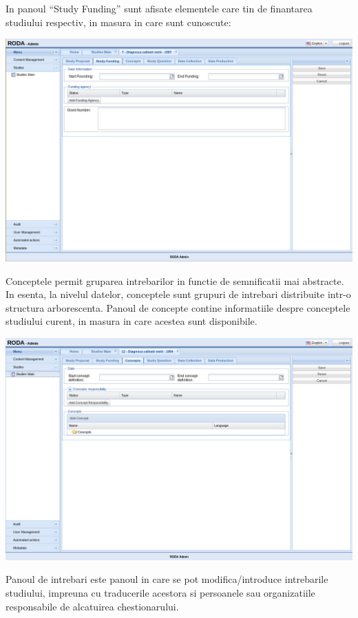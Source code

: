 In panoul “Study Funding” sunt afisate elementele care tin de finantarea studiului respectiv, in masura in care sunt cunoscute:

\includegraphics[width=16cm]{img/studyedit-funding}

Conceptele permit gruparea intrebarilor in functie de semnificatii mai abstracte. In esenta, la nivelul datelor, conceptele sunt grupuri de intrebari distribuite intr-o structura arborescenta. Panoul de concepte contine informatiile despre conceptele studiului curent, in masura in care acestea sunt disponibile.

\includegraphics[width=16cm]{img/studyedit-concepts}

Panoul de intrebari este panoul in care se pot modifica/introduce intrebarile studiului, impreuna cu traducerile acestora si persoanele sau organizatiile responsabile de alcatuirea chestionarului. 

